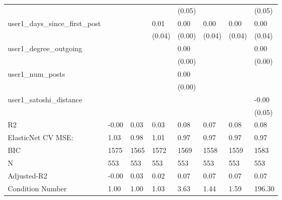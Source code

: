 \begin{table}
\begin{center}
\begin{tabular}{llllllll}
                                               &          &            &         & (0.05)  &          &             & (0.05)   \\
user1_days_since_first_post                    &          &            & 0.01    & 0.00    & 0.00     & 0.00        & 0.00     \\
                                               &          &            & (0.04)  & (0.00)  & (0.04)   & (0.04)      & (0.04)   \\
user1_degree_outgoing                          &          &            &         & 0.00    &          &             & 0.00     \\
                                               &          &            &         & (0.00)  &          &             & (0.00)   \\
user1_num_posts                                &          &            &         & 0.00    &          &             &          \\
                                               &          &            &         & (0.00)  &          &             &          \\
user1_satoshi_distance                         &          &            &         &         &          &             & -0.00    \\
                                               &          &            &         &         &          &             & (0.05)   \\
R2                                             & -0.00    & 0.03       & 0.03    & 0.08    & 0.07     & 0.08        & 0.08     \\
ElasticNet CV MSE:                             & 1.03     & 0.98       & 1.01    & 0.97    & 0.97     & 0.97        & 0.97     \\
BIC                                            & 1575     & 1565       & 1572    & 1569    & 1558     & 1559        & 1583     \\
N                                              & 553      & 553        & 553     & 553     & 553      & 553         & 553      \\
Adjusted-R2                                    & -0.00    & 0.03       & 0.02    & 0.07    & 0.07     & 0.07        & 0.07     \\
Condition Number                               & 1.00     & 1.00       & 1.03    & 3.63    & 1.44     & 1.59        & 196.30   \\
\hline
\end{tabular}
\end{center}
\end{table}